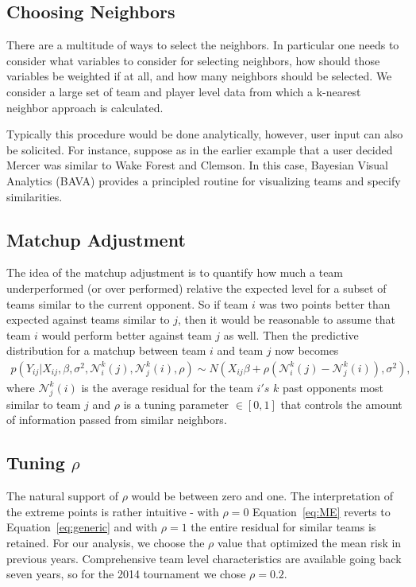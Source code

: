 \subsection{Choosing Neighbors}
There are a multitude of ways to select the neighbors.  In particular one needs to consider what variables to consider for selecting neighbors, how should those variables be weighted if at all, and how many neighbors should be selected.  We consider a large set of team and player level data from which a k-nearest neighbor approach is calculated.

Typically this procedure would be done analytically, however, user input can also be solicited.  For instance, suppose as in the earlier example that a user decided Mercer was similar to Wake Forest and Clemson.  In this case, Bayesian Visual Analytics (BAVA) provides a principled routine for visualizing teams and specify similarities.
\subsection{Matchup Adjustment}
The idea of the matchup adjustment is to quantify how much a team underperformed (or over performed) relative the expected level for a subset of teams similar to the current opponent.  So if team $i$ was two points better than expected against teams similar to $j$, then it would be reasonable to assume that team $i$ would perform better against team $j$ as well.  Then the predictive distribution for a matchup between team $i$ and team $j$ now becomes
\begin{eqnarray}
p(Y_{ij}|X_{ij}, \beta,\sigma^2,\mathcal{N}_i^k(j),\mathcal{N}_j^k(i), \rho) \sim N(X_{ij} \beta + \rho(\mathcal{N}_i^k(j) -\mathcal{N}_j^k(i)), \sigma^2),
\label{eq:ME}
\end{eqnarray}
where $\mathcal{N}_j^k(i)$ is the average residual for the team $i's$ $k$ past opponents most similar to team $j$ and $\rho$ is a tuning parameter $\in [0,1]$ that controls the amount of information passed from similar neighbors. 
\subsection{Tuning $\rho$}
The natural support of $\rho$ would be between zero and one.  The interpretation of the extreme points is rather intuitive - with $\rho = 0$ Equation~\ref{eq:ME} reverts to Equation~\ref{eq:generic} and with $\rho = 1$ the entire residual for similar teams is retained.  For our analysis, we choose the $\rho$ value that optimized the mean risk in previous years.  Comprehensive team level characteristics are available going back seven years, so for the 2014 tournament we chose $\rho=0.2$.
